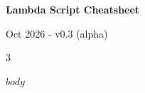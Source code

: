 \documentclass[8pt,landscape,a4paper,oneside]{article}
\begin{document}
\begin{center}
{\Large \textbf{Lambda Script Cheatsheet}}
\end{center}
\vspace{-8pt}
\begin{flushright}
{\small Oct 2026 - v0.3 (alpha)}
\end{flushright}

\vspace{3pt}

\begin{multicols*}{3}
\raggedright
$body$
\end{multicols*}
\end{document}
